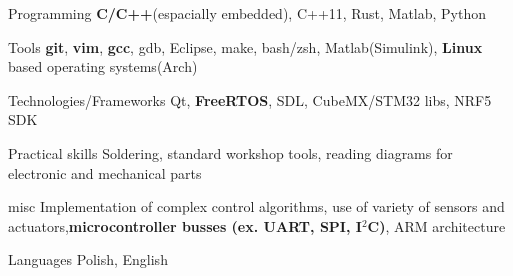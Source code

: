 

\begin{cvskills}

  \cvskill
    {Programming} %
    {\textbf{C/C++}(espacially embedded), C++11, Rust, Matlab, Python} %

  \cvskill
    {Tools} %
    {\textbf{git}, \textbf{vim}, \textbf{gcc}, gdb, Eclipse, make, bash/zsh, Matlab(Simulink),
      \textbf{Linux} based operating
    systems(Arch)} %

  \cvskill
    {Technologies/Frameworks} %
    {Qt, \textbf{FreeRTOS}, SDL, CubeMX/STM32 libs, NRF5 SDK} %

  \cvskill
  {Practical skills} %
  {Soldering, standard workshop tools, reading diagrams for electronic and mechanical parts} %

  \cvskill
    {misc} %
    {Implementation of complex control algorithms, use of variety of sensors and
    actuators,\newline \textbf{microcontroller busses (ex. UART, SPI, I\(^{2}\)C)}, ARM architecture} %

  \cvskill
    {Languages} %
    {Polish, English} %

\end{cvskills}

